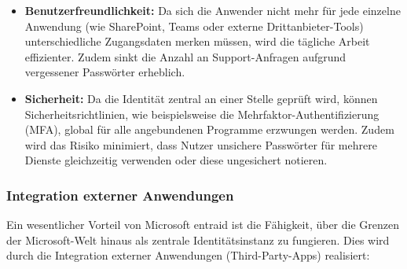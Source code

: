\begin{itemize}

    \item \textbf{Benutzerfreundlichkeit:}
          Da sich die Anwender nicht mehr für jede einzelne Anwendung (wie
          SharePoint, Teams oder externe Drittanbieter-Tools) unterschiedliche
          Zugangsdaten merken müssen, wird die tägliche Arbeit effizienter. Zudem
          sinkt die Anzahl an Support-Anfragen aufgrund vergessener Passwörter
          erheblich. \cite{msentra2025}

    \item \textbf{Sicherheit:}
          Da die Identität zentral an einer Stelle geprüft wird, können
          Sicherheitsrichtlinien, wie beispielsweise die
          Mehrfaktor-Authentifizierung (MFA), global für alle angebundenen
          Programme erzwungen werden. Zudem wird das Risiko minimiert, dass Nutzer
          unsichere Passwörter für mehrere Dienste gleichzeitig verwenden oder diese
          ungesichert notieren.
          \cite{msentra2025,tsolkas2017rollen}

\end{itemize}

\subsubsection{Integration externer Anwendungen}

Ein wesentlicher Vorteil von Microsoft \gls{entraid} ist die Fähigkeit, über die Grenzen
der Microsoft-Welt hinaus als zentrale Identitätsinstanz zu fungieren. Dies wird
durch die Integration externer Anwendungen (Third-Party-Apps) realisiert:

